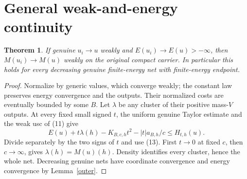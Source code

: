 \documentclass[11pt]{article}
\newtheorem{theorem}{Theorem}
\begin{document}
\section{General weak-and-energy continuity}
\begin{theorem}\label{continuity}
If genuine $u_i\to u$ weakly and $E(u_i)\to E(u)>-\infty$,
then $M(u_i)\to M(u)$ weakly on the original compact carrier.
In particular this holds for every decreasing genuine finite-energy
net with finite-energy endpoint.
\end{theorem}
\begin{proof}
Normalize by generic values, which converge weakly; the constant
law preserves energy convergence and the outputs.
Their normalized costs are eventually bounded by some $B$.
Let $\lambda$ be any cluster of their positive mass-$V$ outputs.
At every fixed small signed $t$, the uniform genuine Taylor
estimate and the weak usc of (11) give
\[
 E(u)+t\lambda(h)-K_{B,c,h}t^2-|t|a_{B,h}/c
       \leq H_{t,h}(u).
\]
Divide separately by the two signs of $t$ and use (13).
First $t\to0$ at fixed $c$, then $c\to\infty$, gives
$\lambda(h)=M(u)(h)$. Density identifies every cluster, hence
the whole net. Decreasing genuine nets have coordinate convergence
and energy convergence by Lemma~\ref{outer}.
\end{proof}
\end{document}
